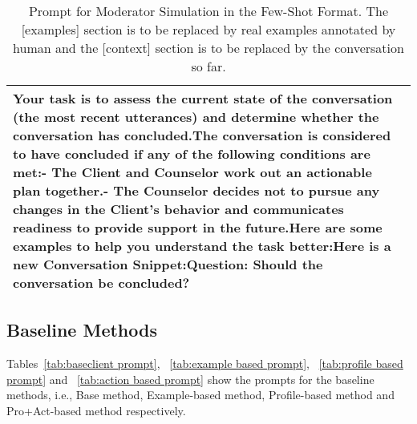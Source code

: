 \begin{table*}[tb]
\begin{tabularx}{\textwidth}{X}
\toprule
Your task is to assess the current state of the conversation (the most recent utterances) and determine whether the conversation has concluded.\newline The conversation is considered to have concluded if any of the following conditions are met:\newline - The Client and Counselor work out an actionable plan together.\newline - The Counselor decides not to pursue any changes in the Client's behavior and communicates readiness to provide support in the future.\newline \newline Here are some examples to help you understand the task better:\newline [examples]\newline \newline \newline Here is a new Conversation Snippet:\newline [context]\newline \newline Question: Should the conversation be concluded?  \\ \bottomrule
\end{tabularx}
\caption{Prompt for Moderator Simulation in the Few-Shot Format. The [examples] section is to be replaced by real examples annotated by human and the [context] section is to be replaced by the conversation so far.}
\label{tab:moderator prompt}
\end{table*}

\subsection{Baseline Methods}
\label{app:baselines}

Tables~\ref{tab:baseclient prompt}, ~\ref{tab:example based prompt}, ~\ref{tab:profile based prompt} and ~\ref{tab:action based prompt} show the prompts for the baseline methods, i.e., Base method, Example-based method, Profile-based method and Pro+Act-based method respectively.

